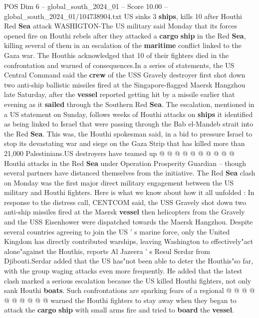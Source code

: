 \begin{textsample}{POS Dim 6 – global\_south\_2024\_01 – Score 10.00 – global\_south\_2024\_01/104738904.txt}  \label{ex:f6_pos_082}
US sinks 3 \textbf{ships}, kills 10 after Houthi Red \textbf{Sea} attack WASHIGTON-The US military said Monday that its forces opened fire on Houthi rebels after they attacked a \textbf{cargo} \textbf{ship} in the Red \textbf{Sea}, killing several of them in an escalation of the \textbf{maritime} conflict linked to the Gaza war.
The Houthis acknowledged that 10 of their fighters died in the confrontation and warned of consequences.In a series of statements, the US Central Command said the \textbf{crew} of the USS Gravely destroyer first shot down two anti-ship ballistic missiles fired at the Singapore-flagged Maersk Hangzhou late Saturday, after the \textbf{vessel} reported getting hit by a missile earlier that evening as it \textbf{sailed} through the Southern Red \textbf{Sea}.
The escalation, mentioned in a US statement on Sunday, follows weeks of Houthi attacks on \textbf{ships} it identified as being linked to Israel that were passing through the Bab el-Mandeb strait into the Red \textbf{Sea}.
This was, the Houthi spokesman said, in a bid to pressure Israel to stop its devastating war and siege on the Gaza Strip that has killed more than 21,000 Palestinians.US destroyers have teamed up @ @ @ @ @ @ @ @ @ @ Houthi attacks in the Red \textbf{Sea} under Operation Prosperity Guardian -- though several partners have distanced themselves from the initiative.
The Red \textbf{Sea} clash on Monday was the first major direct military engagement between the US military and Houthi fighters.
Here is what we know about how it all unfolded : In response to the distress call, CENTCOM said, the USS Gravely shot down two anti-ship missiles fired at the Maersk \textbf{vessel} then helicopters from the Gravely and the USS Eisenhower were dispatched towards the Maersk Hangzhou.
Despite several countries agreeing to join the US ' s marine force, only the United Kingdom has directly contributed warships, leaving Washington to effectively"act alone"against the Houthis, reports Al Jazeera ' s Resul Serdar from Djibouti.Serdar added that the US has"not been able to deter the Houthis"so far, with the group waging attacks even more frequently.
He added that the latest clash marked a serious escalation because the US killed Houthi fighters, not only sank Houthi \textbf{boats}.
Such confrontations are sparking fears of a regional @ @ @ @ @ @ @ @ @ @ warned the Houthi fighters to stay away when they began to attack the \textbf{cargo} \textbf{ship} with small arms fire and tried to \textbf{board} the \textbf{vessel}.

\end{textsample}

